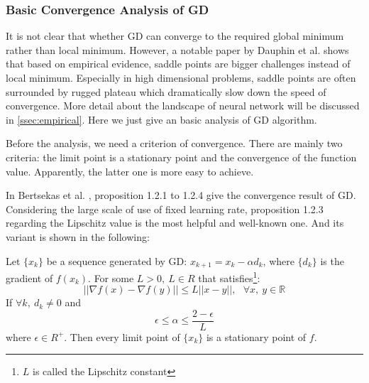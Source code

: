 \subsubsection{Basic Convergence Analysis of GD}
It is not clear that whether GD can converge to the required global minimum
rather than local minimum. However, a notable paper by Dauphin et al. 
\parencite{dauphin2014identifying} shows that based on empirical evidence,
saddle points are bigger challenges instead of local minimum. Especially 
in high dimensional problems, saddle points are often surrounded by 
rugged plateau which dramatically slow down the speed of convergence.
More detail about the landscape of neural network will be discussed in 
\autoref{ssec:empirical}. Here we just give an basic analysis of GD algorithm.
\par Before the analysis, we need a criterion of convergence. There are mainly
two criteria: the limit point is a stationary point and the convergence of 
the function value. Apparently, the latter one is more easy to achieve.
\par In Bertsekas et al. \parencite{bertsekas1997nonlinear}, proposition 
1.2.1 to 1.2.4 give the convergence result of GD. Considering the large
scale of use of fixed learning rate, proposition 1.2.3 regarding the 
Lipschitz value is the most helpful and well-known one. And its variant
is shown in the following:
\begin{pro}
    \label{pro:ConstantConvergence}
    Let $ \{x_k\} $ be a sequence generated by GD: $ x_{k+1} = x_{k} - \alpha d_k $,
    where $ \{d_k\} $ is the gradient of $ f(x_k) $. For some $ L>0,\ 
    L \in R $  that satisfies\footnote{$ L $ is called the Lipschitz constant}:
    \begin{equation}
        ||\nabla f(x) - \nabla f(y)||\leq L||x - y||,\ \ \ \forall x,\ y \in \mathbb{R}
    \end{equation}
    If $ \forall k,\ d_k \neq 0 $ and 
    \begin{equation}
        \label{equ:learningRate}
        \epsilon \leq \alpha \leq \frac{2-\epsilon}{L}
    \end{equation}
    where $ \epsilon \in R^+ $. Then every limit point of $ \{x_k\} $ is a 
    stationary point of $f$.
\end{pro}

